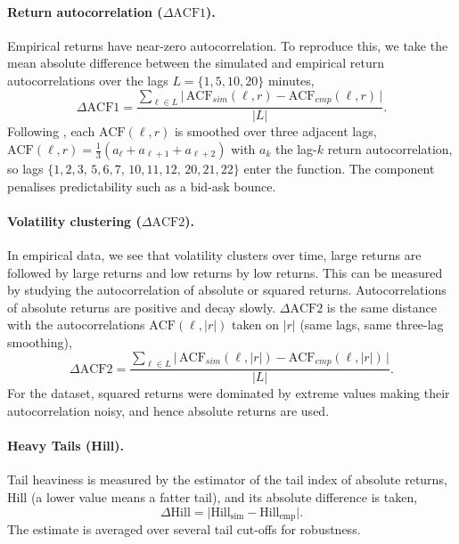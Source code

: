 \paragraph{Return autocorrelation ($\Delta\mathrm{ACF1}$).} Empirical returns have near-zero autocorrelation. To reproduce this, we take the mean absolute difference between the simulated and empirical return autocorrelations over the lags $L=\{1,5,10,20\}$ minutes,
\begin{equation}
\Delta\mathrm{ACF1} = \frac{\sum_{\ell\in L}\big|\,\mathrm{ACF}_{sim}(\ell,r)-\mathrm{ACF}_{emp}(\ell,r)\,\big|}{|L|}.
\end{equation}
Following \citet{gao_2022_xgb}, each $\mathrm{ACF}(\ell,r)$ is smoothed over three adjacent lags,
$\mathrm{ACF}(\ell,r)=\tfrac13(a_\ell+a_{\ell+1}+a_{\ell+2})$ with $a_k$ the lag-$k$ return
autocorrelation, so lags $\{1,2,3,\,5,6,7,\,10,11,12,\,20,21,22\}$ enter the function. The
component penalises predictability such as a bid-ask bounce.


\paragraph{Volatility clustering ($\Delta\mathrm{ACF2}$).} In empirical data, we see that volatility clusters over time, large returns are followed by large returns and low returns by low returns. This can be measured by studying the autocorrelation of absolute or squared returns. Autocorrelations of absolute returns are positive and decay slowly. $\Delta\mathrm{ACF2}$ is the same distance with the autocorrelations $\mathrm{ACF}(\ell,|r|)$
taken on $|r|$ (same lags, same three-lag smoothing),
\begin{equation}
\Delta\mathrm{ACF2} = \frac{\sum_{\ell\in L}\big|\,\mathrm{ACF}_{sim}(\ell,|r|)-\mathrm{ACF}_{emp}(\ell,|r|)\,\big|}{|L|}.
\end{equation}
For the dataset, squared returns were dominated by extreme values making their autocorrelation noisy, and hence absolute returns are used.

\paragraph{Heavy Tails (Hill).} Tail heaviness is measured by the \citet{hill_1975} estimator of the
tail index of absolute returns, $\mathrm{Hill}$ (a lower value means a fatter tail), and its absolute difference is taken,
\begin{equation}
\Delta\mathrm{Hill} = \big| \mathrm{Hill}_{\mathrm{sim}} - \mathrm{Hill}_{\mathrm{emp}} \big|.
\end{equation}
The estimate is averaged over several tail cut-offs for robustness. \\

